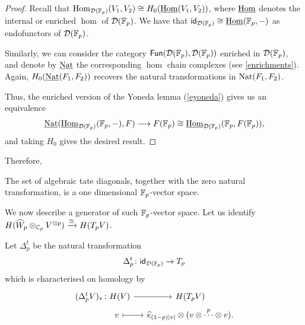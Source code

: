 \begin{proof}
	Recall that \(\mathrm{Hom}_{\mathcal{D}({\mathbb{F}_p})}(V_1,V_2)\cong H_0(\underline{\mathrm{Hom}}(V_1,V_2))\), where \(\underline{\mathrm{Hom}}\) denotes the internal or enriched \(\hom\) of \(\mathcal{D}({\mathbb{F}_p})\).
	We have that \(\mathsf{id}_{\mathcal{D}({\mathbb{F}_p})} \cong \underline{\mathrm{Hom}}({\mathbb{F}_p}, - )\) as endofunctors of \(\mathcal{D}({\mathbb{F}_p})\).
	
	Similarly, we can consider the category \(\mathsf{Fun}(\mathcal{D}({\mathbb{F}_p}),\mathcal{D}({\mathbb{F}_p}))\) enriched in \(\mathcal{D}({\mathbb{F}_p})\), and denote by \(\underline{\operatorname{Nat}}\) the corresponding \(\hom\) chain complexes (see \cref{enrichments}).
	Again, \(H_0(\underline{\operatorname{Nat}}(F_1,F_2))\) recovers the natural transformations in \(\operatorname{Nat}(F_1,F_2)\).
	
	Thus, the enriched version of the Yoneda lemma (\cref{eyoneda}) gives us an equivalence
	\[
	\underline{\operatorname{Nat}}(\underline{\mathrm{Hom}}_{\mathcal{D}({\mathbb{F}_p})}({\mathbb{F}_p}, - ), F) \longrightarrow F({\mathbb{F}_p}) \cong \underline{\mathrm{Hom}}_{\mathcal{D}({\mathbb{F}_p})}({\mathbb{F}_p}, F({\mathbb{F}_p})),
	\]
	and taking \(H_0\) gives the desired result.
\end{proof}

Therefore, 


\begin{corollary}
	The set of algebraic tate diagonals, together with the zero natural transformation, is a one dimensional \({\mathbb{F}_p}\)-vector space.
\end{corollary}


We now describe a generator of such \({\mathbb{F}_p}\)-vector space.
Let us identify \(H(\widehat W_p \otimes_{\mathbb{C}_p} V^{\otimes p}) \xrightarrow{\cong} H(T_pV)\).

\begin{definition}
	Let \(\Delta^t_p\) be the natural transformation
	\[
	\Delta^t_p \colon \mathsf{id}_{\mathcal{D}({\mathbb{F}_p})} \to T_p
	\]
	which is characterised on homology by
	\[
	\begin{tikzcd}[row sep=0, column sep=small]
		(\Delta^t_pV)_* &[-20pt] \colon H(V) \arrow[r] & H(T_pV) \\
		& v \arrow[r, |->] & \widehat{e}_{(1-p)|v|} \ot (v \ot \overset{p}{\cdots} \ot v).
	\end{tikzcd}
	\]
\end{definition}

